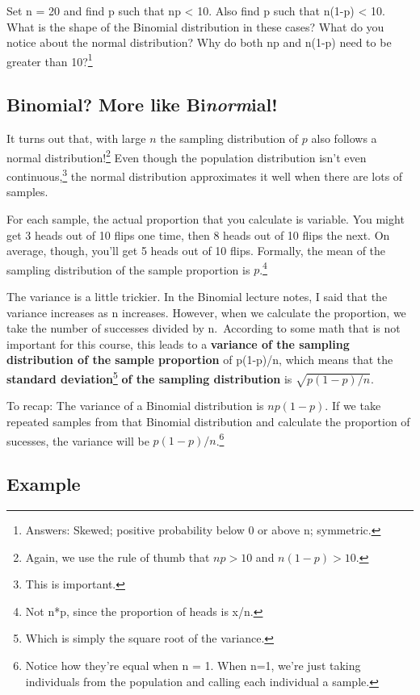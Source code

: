 \documentclass[
  letterpaper,
  DIV=11,
  numbers=noendperiod,
  oneside]{scrreprt}
\begin{document}
Set n = 20 and find p such that np \textless{} 10. Also find p such that
n(1-p) \textless{} 10. What is the shape of the Binomial distribution in
these cases? What do you notice about the normal distribution? Why do
both np and n(1-p) need to be greater than 10?\footnote{Answers: Skewed;
  positive probability below 0 or above n; symmetric.}

\hypertarget{binomial-more-like-binormial}{%
\subsection{\texorpdfstring{Binomial? More like
Bi\emph{norm}ial!}{Binomial? More like Binormial!}}\label{binomial-more-like-binormial}}

It turns out that, with large \(n\) the sampling distribution of \(p\)
also follows a normal distribution!\footnote{Again, we use the rule of
  thumb that \(np>10\) and \(n(1-p)>10\).} Even though the population
distribution isn't even continuous,\footnote{This is important.} the
normal distribution approximates it well when there are lots of samples.

For each sample, the actual proportion that you calculate is variable.
You might get 3 heads out of 10 flips one time, then 8 heads out of 10
flips the next. On average, though, you'll get 5 heads out of 10 flips.
Formally, the mean of the sampling distribution of the sample proportion
is \(p\).\footnote{Not n*p, since the proportion of heads is x/n.}

The variance is a little trickier. In the Binomial lecture notes, I said
that the variance increases as n increases. However, when we calculate
the proportion, we take the number of successes divided by n.~According
to some math that is not important for this course, this leads to a
\textbf{variance of the sampling distribution of the sample proportion}
of p(1-p)/n, which means that the \textbf{standard deviation}\footnote{Which
  is simply the square root of the variance.} \textbf{of the sampling
distribution} is \(\sqrt{p(1-p)/n}\).

To recap: The variance of a Binomial distribution is \(np(1-p)\). If we
take repeated samples from that Binomial distribution and calculate the
proportion of sucesses, the variance will be \(p(1-p)/n\).\footnote{Notice
  how they're equal when n = 1. When n=1, we're just taking individuals
  from the population and calling each individual a sample.}

\hypertarget{example-2}{%
\subsection{Example}\label{example-2}}
\end{document}
